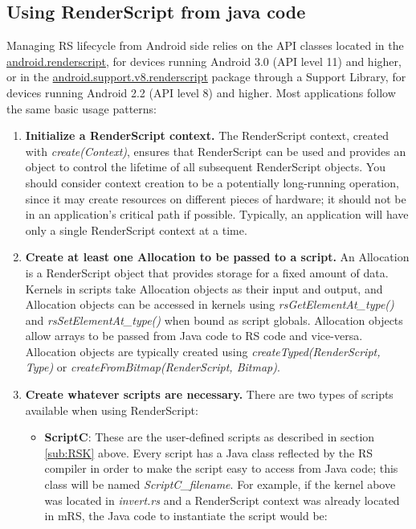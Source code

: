 \documentclass[a4paper,10pt]{article}
\begin{document}
\begin{multicols}{2}
\subsection{Using RenderScript from java code}
Managing RS lifecycle from Android side relies on the API classes located in the \href{http://developer.android.com/reference/android/renderscript/package-summary.html}{android.renderscript}, for devices running Android 3.0 (API level 11) and higher, or in the \href{http://developer.android.com/reference/android/support/v8/renderscript/package-summary.html}{android.support.v8.renderscript} package through a Support Library, for devices running Android 2.2 (API level 8) and higher. Most applications follow the same basic usage patterns:
\begin{enumerate}
\item {\bf Initialize a RenderScript context.} The RenderScript context, created with \textit{create(Context)}, ensures that RenderScript can be used and provides an object to control the lifetime of all subsequent RenderScript objects. You should consider context creation to be a potentially long-running operation, since it may create resources on different pieces of hardware; it should not be in an application's critical path if possible. Typically, an application will have only a single RenderScript context at a time.
\item {\bf Create at least one Allocation to be passed to a script.} An Allocation is a RenderScript object that provides storage for a fixed amount of data. Kernels in scripts take Allocation objects as their input and output, and Allocation objects can be accessed in kernels using \emph{rsGetElementAt\_type()} and \emph{rsSetElementAt\_type()} when bound as script globals. Allocation objects allow arrays to be passed from Java code to RS code and vice-versa. Allocation objects are typically created using \emph{createTyped(RenderScript, Type)} or \emph{createFromBitmap(RenderScript, Bitmap)}.
\item {\bf Create whatever scripts are necessary.} There are two types of scripts available when using RenderScript:
\begin{itemize}
\item {\bf ScriptC}: These are the user-defined scripts as described in section \ref{sub:RSK} above. Every script has a Java class reflected by the RS compiler in order to make the script easy to access from Java code; this class will be named \emph{ScriptC\_filename}. For example, if the kernel above was located in \emph{invert.rs} and a RenderScript context was already located in mRS, the Java code to instantiate the script would be:

\end{itemize}
\end{enumerate}
\end{multicols}
\end{document}

